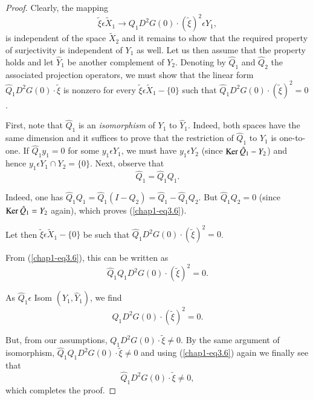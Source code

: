 \begin{proof}
Clearly, the mapping
$$
\widetilde{\xi} \epsilon \widetilde{X}_{1} \to Q_{1}D^{2}G(0) \cdot (\widetilde{\xi})^{2} \epsilon Y_{1},
$$
is independent of the space $\widetilde{X}_{2}$ and it remains to show that the required property of surjectivity is independent of $Y_{1}$ as well. Let us then assume that the property holds and let $\hat{Y}_{1}$ be another complement of $Y_{2}$. Denoting by $\hat{Q}_{1}$ and $\hat{Q}_{2}$ the associated projection operators, we must show that the linear form $\hat{Q}_{1}D^{2}G(0) \cdot \widetilde{\xi}$ is nonzero for every $\widetilde{\xi} \epsilon \widetilde{X}_{1} - \{0 \}$ such that $\hat{Q}_{1}D^{2}G(0) \cdot (\widetilde{\xi})^{2} = 0$.

First, note that $\hat{Q}_{1}$ is an {\em isomorphism} of $Y_{1}$ to $\hat{Y}_{1}$. Indeed, both spaces have the same dimension and it suffices to prove that the restriction of $\hat{Q}_{1}$ to $Y_{1}$ is one-to-one. If $\hat{Q}_{1} y_{1} = 0$ for some $y_{1} \epsilon Y_{1}$, we must have $y_{1} \epsilon Y_{2}$ (since $\operatorname{Ker} \hat{Q}_{1} - Y_{2}$) and hence $y_{1} \epsilon Y_{1} \cap Y_{2} = \{0\}$. Next, observe that
\begin{equation*}
\hat{Q}_{1} = \hat{Q}_{1} Q_{1}.\tag{3.6}\label{chap1-eq3.6}
\end{equation*}

Indeed, one has $\hat{Q}_{1} Q_{1} = \hat{Q}_{1}(I - Q_{2}) = \hat{Q}_{1} - \hat{Q}_{1} Q_{2}$. But $\hat{Q}_{1} Q_{2} = 0$ (since $\operatorname{Ker} \hat{Q}_{1} = Y_{2}$ again), which proves (\ref{chap1-eq3.6}).

Let then $\widetilde{\xi} \epsilon \widetilde{X}_{1} - \{0\}$ be such that $\hat{Q}_{1}D^{2}G(0) \cdot (\widetilde{\xi})^{2} = 0$.

From (\ref{chap1-eq3.6}), this can be written as
$$
\hat{Q}_{1} Q_{1} D^{2}G(0) \cdot (\widetilde{\xi})^{2} = 0.
$$

As $\hat{Q}_{1} \epsilon$ Isom $(Y_{1}, \hat{Y}_{1})$, we find
$$
Q_{1}D^{2}G(0) \cdot (\widetilde{\xi})^{2} = 0.
$$\pageoriginale

But, from our assumptions, $Q_{1}D^{2}G(0) \cdot \widetilde{\xi} \neq 0$. By the same argument of isomorphism, $\hat{Q}_{1} Q_{1} D^{2}G(0) \cdot \widetilde{\xi} \neq 0$ and using (\ref{chap1-eq3.6}) again we finally see that
$$
\hat{Q}_{1} D^{2}G(0) \cdot \widetilde{\xi} \neq 0,
$$
which completes the proof.
\end{proof}

